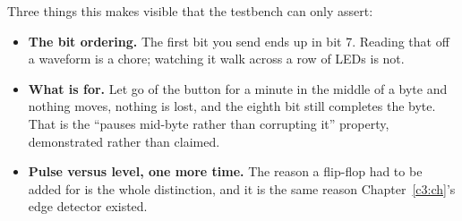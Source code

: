 Three things this makes visible that the testbench can only assert:
\begin{itemize}
  \item \textbf{The bit ordering.} The first bit you send ends up in bit 7. Reading that off a
    waveform is a chore; watching it walk across a row of LEDs is not.
  \item \textbf{What  is for.} Let go of the button for a minute in the middle
    of a byte and nothing moves, nothing is lost, and the eighth bit still completes the byte. That
    is the ``pauses mid-byte rather than corrupting it'' property, demonstrated rather than claimed.
  \item \textbf{Pulse versus level, one more time.} The reason a flip-flop had to be added for
     is the whole distinction, and it is the same reason Chapter~\ref{c3:ch}'s
    edge detector existed.
\end{itemize}
